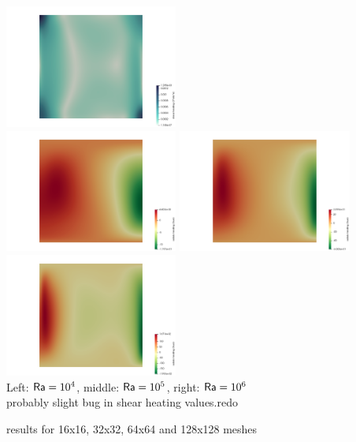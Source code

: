 \begin{center}
\includegraphics[width=5.7cm]{python_codes/fieldstone_110/results_EBA/sh_1e6}\\
\includegraphics[width=5.7cm]{python_codes/fieldstone_110/results_EBA/adiab_1e4}
\includegraphics[width=5.7cm]{python_codes/fieldstone_110/results_EBA/adiab_1e5}
\includegraphics[width=5.7cm]{python_codes/fieldstone_110/results_EBA/adiab_1e6}\\
{\captionfont Left: ${\mathsf{Ra}}=10^4$, middle: ${\mathsf{Ra}}=10^5$, right: ${\mathsf{Ra}}=10^6$}\\
probably slight bug in shear heating values.redo 
\end{center}

\newpage
\aspect results for 16x16, 32x32, 64x64 and 128x128 meshes

